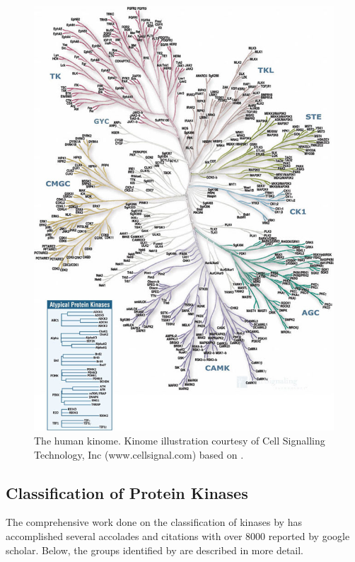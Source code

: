\documentclass[a4paper, 11pt]{article}
\begin{document}
\begin{figure}[H]
	\includegraphics[width=.9\linewidth]{figures/kinome.jpg}
	\centering
	\caption{The human kinome. Kinome illustration courtesy of Cell Signalling 			Technology, Inc (www.cellsignal.com) based on \cite{manning2002protein}.}
	\label{KinomeDendogram}
\end{figure}
\subsection*{Classification of Protein Kinases}
The comprehensive work done on the classification of kinases by \cite{manning2002protein} has accomplished several accolades and citations with over 8000 reported by google scholar. 
Below, the groups identified by \cite{manning2002protein} are described in more detail. \\
\end{document}
